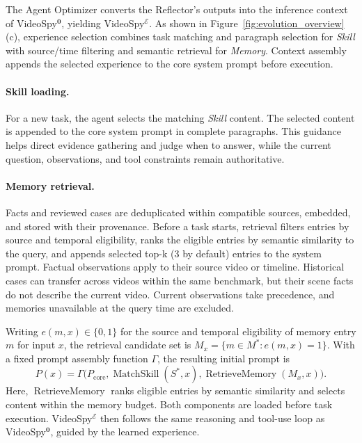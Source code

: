 \documentclass{article} %
\begin{document}
The Agent Optimizer converts the Reflector's outputs into the inference context of VideoSpy$^{\mathbf{0}}$, yielding VideoSpy$^{\mathcal{E}}$. As shown in Figure~\ref{fig:evolution_overview}(c), experience selection combines task matching and paragraph selection for \textit{Skill} with source/time filtering and semantic retrieval for \textit{Memory}. Context assembly appends the selected experience to the core system prompt before execution.

\paragraph{Skill loading.}
For a new task, the agent selects the matching \textit{Skill} content. The selected content is appended to the core system prompt in complete paragraphs. This guidance helps direct evidence gathering and judge when to answer, while the current question, observations, and tool constraints remain authoritative.

\paragraph{Memory retrieval.}
Facts and reviewed cases are deduplicated within compatible sources, embedded, and stored with their provenance. Before a task starts, retrieval filters entries by source and temporal eligibility, ranks the eligible entries by semantic similarity to the query, and appends selected top-k (3 by default) entries to the system prompt. Factual observations apply to their source video or timeline. Historical cases can transfer across videos within the same benchmark, but their scene facts do not describe the current video. Current observations take precedence, and memories unavailable at the query time are excluded.

Writing $e(m,x)\in\{0,1\}$ for the source and temporal eligibility of memory entry $m$ for input $x$, the retrieval candidate set is $M_x=\{m\in M^*:e(m,x)=1\}$. With a fixed prompt assembly function $\Gamma$, the resulting initial prompt is
\begin{equation}
P(x)=\Gamma\bigl(P_{\mathrm{core}},
\operatorname{MatchSkill}(S^*,x),
\operatorname{RetrieveMemory}(M_x,x)\bigr).
\end{equation}
Here, $\operatorname{RetrieveMemory}$ ranks eligible entries by semantic similarity and selects content within the memory budget. Both components are loaded before task execution. VideoSpy$^{\mathcal{E}}$ then follows the same reasoning and tool-use loop as VideoSpy$^{\mathbf{0}}$, guided by the learned experience.
\end{document}

